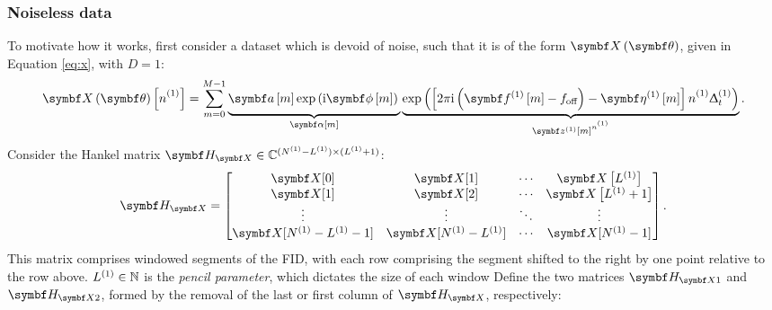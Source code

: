 \subsubsection{Noiseless data}
To motivate how it
works, first consider a dataset which is devoid of noise, such that it is of
the form $\bXth$, given in Equation \ref{eq:x}, with $D=1$:
\begin{equation}
        \bX \left(\bth\right) \left[\none\right] =
            \sum_{m=0}^{M-1}
            \underbrace{
                \bdam \exp\left(
                    \iu \bdphim
                \right)
            \vphantom{
                \exp\left(
                    \left[ 2 \pi \iu \left(\bdfonem - \foff\right) - \bdetaonem\right] \none \Dtone
                \right)
            }}
            _{\bdalpham}
            \underbrace{
                \exp\left(
                    \left[ 2 \pi \iu \left(\bdfonem - \foff\right) - \bdetaonem\right] \none \Dtone
                \right)
            }_{\bdzonem^{\none}}.
            \label{eq:x1D}
\end{equation}
Consider the Hankel matrix $\HX \in \mathbb{C}^{(\None - \Lone) \times (\Lone + 1)}$:
\begin{equation}
    \HX =
    \begin{bmatrix}
        \bX[0] & \bX[1] & \cdots & \bX\left[\Lone\right] \\
        \bX[1] & \bX[2] & \cdots & \bX\left[\Lone+1\right] \\
        \vdots & \vdots & \ddots & \vdots\\
        \bX[\None-\Lone-1] & \bX[\None-\Lone] & \cdots & \bX[\None-1]\\
    \end{bmatrix}.
\end{equation}
This matrix comprises windowed segments of the FID, with each row comprising
the segment shifted to the right by one point relative to the row above. $L^{(1)}
\in \mathbb{N}$ is the \emph{pencil parameter}, which dictates the size of each window
Define the two matrices $\HXone$ and $\HXtwo$, formed by the removal
of the last or first column of $\HX$, respectively:

